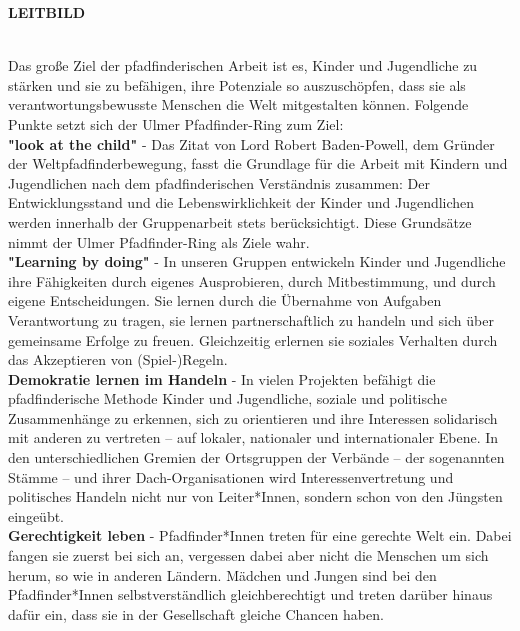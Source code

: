 \begin{Large}
    \textbf{LEITBILD}
\end{Large}
\\

Das große Ziel der pfadfinderischen Arbeit ist es, Kinder und Jugendliche zu stärken und sie zu 
befähigen, ihre Potenziale so auszuschöpfen, dass sie als verantwortungsbewusste Menschen die 
Welt mitgestalten können. Folgende Punkte setzt sich der Ulmer Pfadfinder-Ring zum Ziel:
\\

\textbf{"look at the child"} - Das Zitat von Lord Robert Baden-Powell, dem Gründer der 
Weltpfadfinderbewegung, fasst die Grundlage für die Arbeit mit Kindern und Jugendlichen nach dem 
pfadfinderischen Verständnis zusammen: Der Entwicklungsstand und die Lebenswirklichkeit der Kinder 
und Jugendlichen werden innerhalb der Gruppenarbeit stets berücksichtigt. Diese Grundsätze nimmt 
der Ulmer Pfadfinder-Ring als Ziele wahr.
\\

\textbf{"Learning by doing"} - In unseren Gruppen entwickeln Kinder und Jugendliche ihre Fähigkeiten 
durch eigenes Ausprobieren, durch Mitbestimmung, und durch eigene Entscheidungen. Sie lernen durch 
die Übernahme von Aufgaben Verantwortung zu tragen, sie lernen partnerschaftlich zu handeln und 
sich über gemeinsame Erfolge zu freuen. Gleichzeitig erlernen sie soziales Verhalten durch das 
Akzeptieren von (Spiel-)Regeln.
\\

\textbf{Demokratie lernen im Handeln} - In vielen Projekten befähigt die pfadfinderische Methode 
Kinder und Jugendliche, soziale und politische Zusammenhänge zu erkennen, sich zu orientieren und 
ihre Interessen solidarisch mit anderen zu vertreten – auf lokaler, nationaler und internationaler 
Ebene. In den unterschiedlichen Gremien der Ortsgruppen der Verbände – der sogenannten Stämme – und 
ihrer Dach-Organisationen wird Interessenvertretung und politisches Handeln nicht nur von 
Leiter*Innen, sondern schon von den Jüngsten eingeübt.
\\

\textbf{Gerechtigkeit leben} - Pfadfinder*Innen treten für eine gerechte Welt ein. Dabei fangen sie 
zuerst bei sich an, vergessen dabei aber nicht die Menschen um sich herum, so wie in anderen 
Ländern. Mädchen und Jungen sind bei den Pfadfinder*Innen selbstverständlich gleichberechtigt und 
treten darüber hinaus dafür ein, dass sie in der Gesellschaft gleiche Chancen haben.
\\

